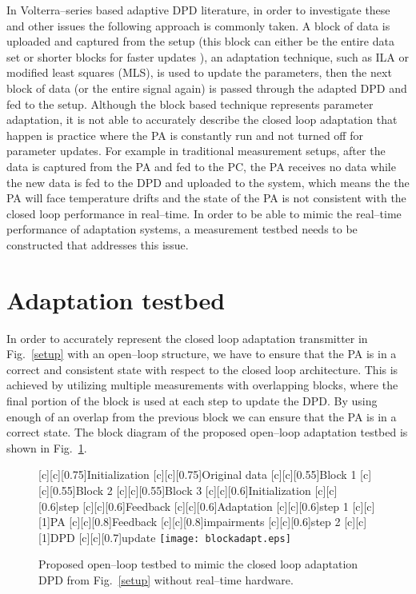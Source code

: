 \documentclass[journal]{IEEEtran}
\begin{document}
In Volterra--series based adaptive DPD literature, in order to investigate these and other issues the following  approach is commonly taken. A block of data is uploaded and captured from the setup (this block can either be the entire data set \cite{liu,braithwaite2012} or shorter blocks for faster updates \cite{braithwaite2008}), an adaptation technique, such as ILA or modified least squares (MLS), is used to update the parameters, then the next block of data (or the entire signal again) is passed through the adapted DPD and fed to the setup. Although the block based technique represents parameter adaptation, it is not able to accurately describe the closed loop adaptation that happen is practice where the PA is constantly run and not turned off for parameter updates. For example in traditional measurement setups, after the data is captured from the PA and fed to the PC, the PA receives no data while the new data is fed to the DPD and uploaded to the system, which means the the PA will face temperature drifts and the state of the PA is not consistent with the closed loop performance in real--time. In order to be able to mimic the real--time performance of adaptation systems, a measurement testbed needs to be constructed that addresses this issue.












\section{Adaptation testbed}
In order to accurately represent the closed loop adaptation transmitter in Fig.~\ref{setup} with an open--loop structure, we have to ensure that the PA is in a correct and consistent state with respect to the closed loop architecture. This is achieved by utilizing multiple measurements with overlapping blocks, where the final portion of the block is used at each step to update the DPD. By using enough of an overlap from the previous block we can ensure that the PA is in a correct state. The block diagram of the proposed open--loop adaptation testbed is shown in Fig.~\ref{testbed}.


\begin{figure}
\centering
{}[c][c][0.75]{Initialization} [c][c][0.75]{Original data}
[c][c][0.55]{Block 1} [c][c][0.55]{Block 2} [c][c][0.55]{Block 3}
[c][c][0.6]{Initialization} [c][c][0.6]{step} [c][c][0.6]{Feedback} [c][c][0.6]{Adaptation} [c][c][0.6]{step 1} [c][c][1]{PA} [c][c][0.8]{Feedback} [c][c][0.8]{impairments} [c][c][0.6]{step 2}
[c][c][1]{DPD} [c][c][0.7]{update}
\texttt{[image: blockadapt.eps]}
\caption{Proposed open--loop testbed to mimic the closed loop adaptation DPD from Fig.~\ref{setup} without real--time hardware.}
\label{testbed}
\end{figure}
\end{document}
